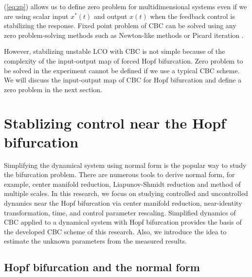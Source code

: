 \documentclass[openacc]{rsproca_new}%
\newcommand{\Eref}[1]{(\ref{#1})}
\begin{document}
\noindent \Eref{eq:zp} allows us to define zero problem for multidimensional systems even if we are using scalar input $x^*(t)$ and output $x(t)$ when the feedback control is stabilizing the response. Fixed point problem of CBC can be solved using any zero problem-solving methods such as Newton-like methods \cite{schilder2015experimental} or Picard iteration \cite{barton2013systematic}.

However, stabilizing unstable LCO with CBC is not simple because of the complexity of the input-output map of forced Hopf bifurcation. Zero problem to be solved in the experiment cannot be defined if we use a typical CBC scheme. We will discuss the input-output map of CBC for Hopf bifurcation and define a zero problem in the next section.

\section{Stablizing control near the Hopf bifurcation}\label{SNH}

Simplifying the dynamical system using normal form is the popular way to study the bifurcation problem. There are numerous tools to derive normal form, for example, center manifold reduction, Liapunov-Shmidt reduction and method of multiple scales. In this research, we focus on studying controlled and uncontrolled dynamics near the Hopf bifurcation via center manifold reduction, near-identity transformation, time, and control parameter rescaling. Simplified dynamics of CBC applied to a dynamical system with Hopf bifurcation provides the basis of the developed CBC scheme of this research. Also, we introduce the idea to estimate the unknown parameters from the measured results.

\subsection{Hopf bifurcation and the normal form}\label{SNF}
\end{document}

